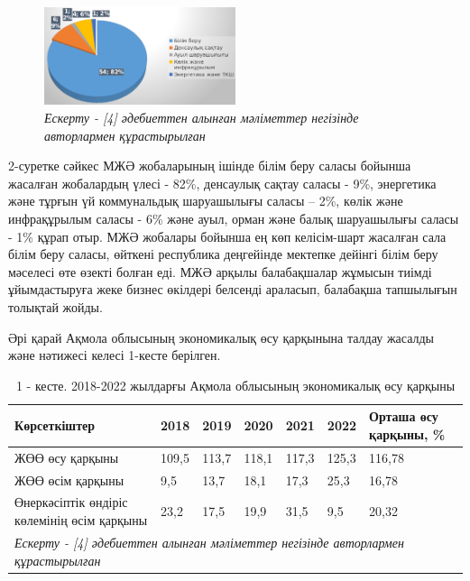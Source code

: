 \begin{figure}[H]
	\centering
	\includegraphics[width=0.5\textwidth]{assets/340.4}
	\caption*{2-сурет. Ақмола облысы бойынша МЖӘ жобаларының құрылымы}
	\caption*{\normalfont \emph{Ескерту - {[}4{]} әдебиеттен алынған мәліметтер негізінде авторлармен құрастырылған}}
\end{figure}

\begin{multicols}{2}
2-суретке сәйкес МЖӘ жобаларының ішінде білім беру саласы бойынша
жасалған жобалардың үлесі - 82\%, денсаулық сақтау саласы - 9\%,
энергетика және тұрғын үй коммунальдық шаруашылығы саласы -- 2\%, көлік
және инфрақұрылым саласы - 6\% және ауыл, орман және балық шаруашылығы
саласы - 1\% құрап отыр. МЖӘ жобалары бойынша ең көп келісім-шарт
жасалған сала білім беру саласы, өйткені республика деңгейінде мектепке
дейінгі білім беру мәселесі өте өзекті болған еді. МЖӘ арқылы
балабақшалар жұмысын тиімді ұйымдастыруға жеке бизнес өкілдері белсенді
араласып, балабақша тапшылығын толықтай жойды.

Әрі қарай Ақмола облысының экономикалық өсу қарқынына талдау жасалды
және нәтижесі келесі 1-кесте берілген.
\end{multicols}

\begin{table}[H]
\caption*{1 - кесте. 2018-2022 жылдарғы Ақмола облысының экономикалық өсу қарқыны}
\centering
\begin{tabular}{|lllllll|}
\hline
\multicolumn{1}{|l|}{Көрсеткіштер} &
  \multicolumn{1}{l|}{2018} &
  \multicolumn{1}{l|}{2019} &
  \multicolumn{1}{l|}{2020} &
  \multicolumn{1}{l|}{2021} &
  \multicolumn{1}{l|}{2022} &
  Орташа өсу қарқыны, \% \\ \hline
\multicolumn{1}{|l|}{ЖӨӨ өсу қарқыны} &
  \multicolumn{1}{l|}{109,5} &
  \multicolumn{1}{l|}{113,7} &
  \multicolumn{1}{l|}{118,1} &
  \multicolumn{1}{l|}{117,3} &
  \multicolumn{1}{l|}{125,3} &
  116,78 \\ \hline
\multicolumn{1}{|l|}{ЖӨӨ өсім қарқыны} &
  \multicolumn{1}{l|}{9,5} &
  \multicolumn{1}{l|}{13,7} &
  \multicolumn{1}{l|}{18,1} &
  \multicolumn{1}{l|}{17,3} &
  \multicolumn{1}{l|}{25,3} &
  16,78 \\ \hline
\multicolumn{1}{|p{0.25\textwidth}|}{Өнеркәсіптік өндіріс көлемінің өсім қарқыны} &
  \multicolumn{1}{l|}{23,2} &
  \multicolumn{1}{l|}{17,5} &
  \multicolumn{1}{l|}{19,9} &
  \multicolumn{1}{l|}{31,5} &
  \multicolumn{1}{l|}{9,5} &
  20,32 \\ \hline
\multicolumn{7}{|l|}{\textit{Ескерту - {[}4{]} әдебиеттен алынған мәліметтер негізінде авторлармен құрастырылған}} \\ \hline
\end{tabular}
\end{table}

